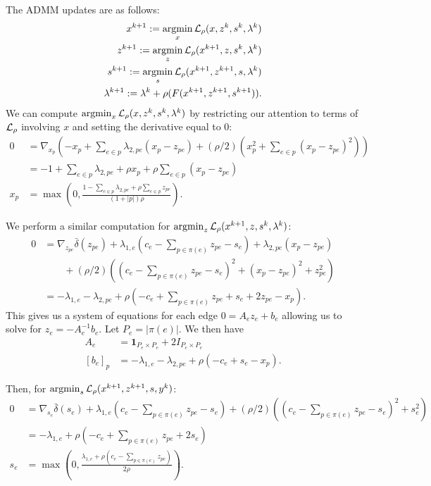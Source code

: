 \documentclass[11pt]{article}
\begin{document}
The ADMM updates are as follows:
\begin{equation}
    \begin{aligned}
        x^{k+1} := \operatorname*{argmin}_{x} \mathcal{L}_\rho(x,z^k,s^{k},\lambda^k)\\
        z^{k+1} := \operatorname*{argmin}_{z} \mathcal{L}_\rho(x^{k+1},z,s^{k},\lambda^k)\\
        s^{k+1} := \operatorname*{argmin}_{s} \mathcal{L}_\rho(x^{k+1},z^{k+1},s,\lambda^k)\\
        \lambda^{k+1} := \lambda^k + \rho(F(x^{k+1},z^{k+1},s^{k+1})).
    \end{aligned}
\end{equation}
We can compute $\operatorname*{argmin}_{x} \mathcal{L}_\rho(x,z^k,s^k,\lambda^k)$ by restricting our
attention to terms of $\mathcal{L}_\rho$ involving $x$ and setting the derivative equal to 0:
\begin{align*}
0
&= \nabla_{x_p}(-x_p + \sum_{e\in p}\lambda_{2,pe}(x_p - z_{pe})
+ (\rho/2)(x_p^2 + \sum_{e \in p}(x_p - z_{pe})^2))\\
&= -1 + \sum_{e \in p}\lambda_{2,pe} + \rho x_p + \rho\sum_{e \in p} (x_p - z_{pe})\\
x_p &= \max(0,\frac{1 - \sum_{e \in p}\lambda_{2,pe} + \rho \sum_{e\in p} z_{pe}}
{(1 + |p|)\rho}).
\end{align*}

We perform a similar computation for $\operatorname*{argmin}_{z} \mathcal{L}_\rho(x^{k+1},z,s^k,\lambda^k)$:
\begin{align*}
0
&= \nabla_{z_{pe}}\bar\delta(z_{pe}) + \lambda_{1,e}(c_e - \sum_{p\in\pi(e)} z_{pe} - s_{e})
    + \lambda_{2,pe}(x_p - z_{pe})\\
& \qquad + (\rho/2)((c_e - \sum_{p\in\pi(e)} z_{pe} - s_e)^2 + (x_p - z_{pe})^2 + z_{pe}^2)\\
&= -\lambda_{1,e} - \lambda_{2,pe}
    + \rho(-c_e + \sum_{p\in\pi(e)} z_{pe} + s_e  + 2z_{pe} - x_p).
\end{align*}
This gives us a system of equations for each edge $0 = A_ez_e + b_e$
allowing us to solve for $z_e = -A_e^{-1}b_e$.
Let $P_e= |\pi(e)|$. We then have
\begin{align*}
A_e &= \mathbf{1}_{P_e\times P_e} + 2I_{P_e\times P_e}\\
[b_e]_p &= -\lambda_{1,e} - \lambda_{2,pe}
    + \rho(-c_e + s_e - x_p).
\end{align*}

Then, for $\operatorname*{argmin}_{s} \mathcal{L}_\rho(x^{k+1},z^{k+1},s,y^k)$:
\begin{align*}
0
&= \nabla_{s_{e}}\bar\delta(s_{e}) + \lambda_{1,e}(c_e - \sum_{p\in\pi(e)} z_{pe} - s_{e})
    + (\rho/2)((c_e - \sum_{p\in\pi(e)} z_{pe} - s_{e})^2 + s_{e}^2)\\
&= -\lambda_{1,e} + \rho(-c_e + \sum_{p\in\pi(e)} z_{pe} + 2s_e)\\
s_{e} &= \max(0,\frac{\lambda_{1,e} + \rho(c_e - \sum_{p\in\pi(e)}z_{pe})}{2\rho}).
\end{align*}
\end{document}
